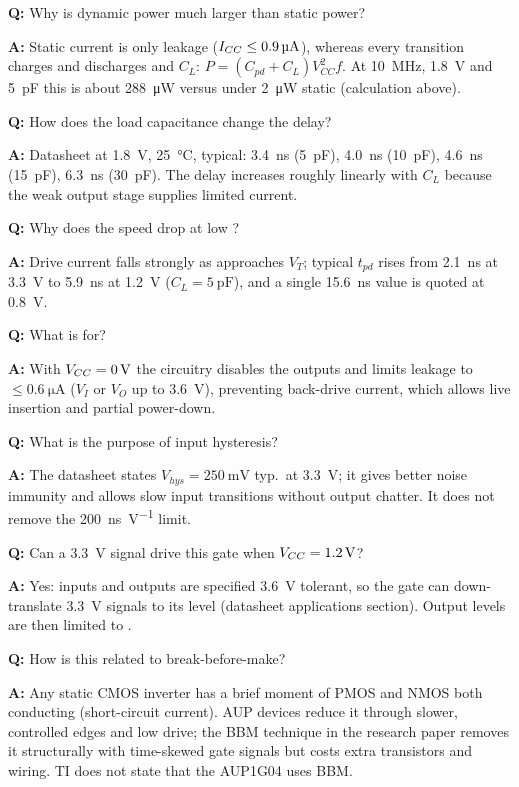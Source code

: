 \documentclass[11pt,a4paper]{article}
\newcommand{\qa}[2]{\par\smallskip\textbf{Q:} #1\par\textbf{A:} #2\par}
\begin{document}
\qa{Why is dynamic power much larger than static power?}
   {Static current is only leakage ($I_{CC}\le\SI{0.9}{\micro\ampere}$), whereas every transition charges and discharges \Cpd{} and $C_L$: $P=(C_{pd}+C_L)V_{CC}^2f$. At \SI{10}{\mega\hertz}, \SI{1.8}{\volt} and \SI{5}{\pico\farad} this is about \SI{288}{\micro\watt} versus under \SI{2}{\micro\watt} static (calculation above).}

\qa{How does the load capacitance change the delay?}
   {Datasheet at \SI{1.8}{\volt}, \SI{25}{\celsius}, typical: \SI{3.4}{\nano\second} (\SI{5}{\pico\farad}), \SI{4.0}{\nano\second} (\SI{10}{\pico\farad}), \SI{4.6}{\nano\second} (\SI{15}{\pico\farad}), \SI{6.3}{\nano\second} (\SI{30}{\pico\farad}). The delay increases roughly linearly with $C_L$ because the weak output stage supplies limited current.}

\qa{Why does the speed drop at low \Vcc?}
   {Drive current falls strongly as \Vcc{} approaches $V_T$; typical $t_{pd}$ rises from \SI{2.1}{\nano\second} at \SI{3.3}{\volt} to \SI{5.9}{\nano\second} at \SI{1.2}{\volt} ($C_L=\SI{5}{\pico\farad}$), and a single \SI{15.6}{\nano\second} value is quoted at \SI{0.8}{\volt}.}

\qa{What is \Ioff{} for?}
   {With $V_{CC}=\SI{0}{\volt}$ the \Ioff{} circuitry disables the outputs and limits leakage to $\le\SI{0.6}{\micro\ampere}$ ($V_I$ or $V_O$ up to \SI{3.6}{\volt}), preventing back-drive current, which allows live insertion and partial power-down.}

\qa{What is the purpose of input hysteresis?}
   {The datasheet states $V_{hys}=\SI{250}{\milli\volt}$ typ.\ at \SI{3.3}{\volt}; it gives better noise immunity and allows slow input transitions without output chatter. It does not remove the \SI{200}{\nano\second\per\volt} limit.}

\qa{Can a \SI{3.3}{\volt} signal drive this gate when $V_{CC}=\SI{1.2}{\volt}$?}
   {Yes: inputs and outputs are specified \SI{3.6}{\volt} tolerant, so the gate can down-translate \SI{3.3}{\volt} signals to its \Vcc{} level (datasheet applications section). Output levels are then limited to \Vcc.}

\qa{How is this related to break-before-make?}
   {Any static CMOS inverter has a brief moment of PMOS and NMOS both conducting (short-circuit current). AUP devices reduce it through slower, controlled edges and low drive; the BBM technique in the research paper removes it structurally with time-skewed gate signals but costs extra transistors and wiring. TI does not state that the AUP1G04 uses BBM.}
\end{document}
